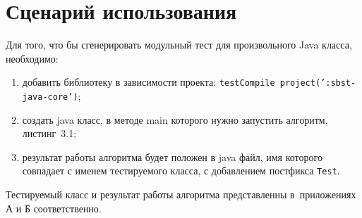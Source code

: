 \section{Сценарий использования}

Для того, что бы сгенерировать модульный тест для произвольного Java класса, необходимо:

\begin{enumerate}
	\item добавить библиотеку в зависимости проекта: \texttt{testCompile project(':sbst-java-core')};
	\item создать java класс, в методе main которого нужно запустить алгоритм, листинг~3.1;
	\item результат работы алгоритма будет положен в java файл, имя которого совпадает с именем тестируемого класса, с добавлением постфикса \texttt{Test}. 
\end{enumerate}

Тестируемый класс и результат работы алгоритма представленны в~приложениях А и Б соответственно.

